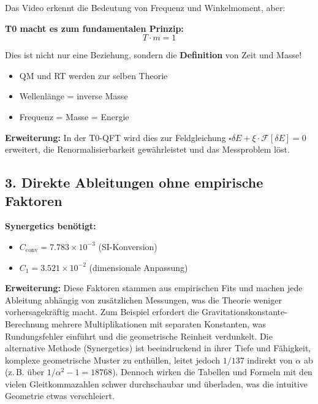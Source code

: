 \documentclass[12pt,a4paper]{article}
\newcommand{\xipar}{\xi}
\begin{document}
	Das Video erkennt die Bedeutung von Frequenz und Winkelmoment, aber:
	
	\begin{vorteil}
		\textbf{T0 macht es zum fundamentalen Prinzip:}
		\begin{equation}
			\boxed{T \cdot m = 1}
		\end{equation}
		
		Dies ist nicht nur eine Beziehung, sondern die \textbf{Definition} von Zeit und Masse!
		\begin{itemize}
			\item QM und RT werden zur selben Theorie
			\item Wellenlänge = inverse Masse
			\item Frequenz = Masse = Energie
		\end{itemize}
		
		\textbf{Erweiterung:} In der T0-QFT wird dies zur Feldgleichung $\square \delta E + \xipar \cdot \mathcal{F}[\delta E] = 0$ erweitert, die Renormalisierbarkeit gewährleistet und das Messproblem löst.
	\end{vorteil}
	
	\subsection{3. Direkte Ableitungen ohne empirische Faktoren}
	
	\textbf{Synergetics benötigt:}
	\begin{itemize}
		\item $C_{\text{conv}} = 7.783 \times 10^{-3}$ (SI-Konversion)
		\item $C_1 = 3.521 \times 10^{-2}$ (dimensionale Anpassung)
	\end{itemize}
	
	\textbf{Erweiterung:} Diese Faktoren stammen aus empirischen Fits und machen jede Ableitung abhängig von zusätzlichen Messungen, was die Theorie weniger vorhersagekräftig macht. Zum Beispiel erfordert die Gravitationskonstante-Berechnung mehrere Multiplikationen mit separaten Konstanten, was Rundungsfehler einführt und die geometrische Reinheit verdunkelt. Die alternative Methode (Synergetics) ist beeindruckend in ihrer Tiefe und Fähigkeit, komplexe geometrische Muster zu enthüllen, leitet jedoch $1/137$ indirekt von $\alpha$ ab (z.\,B. über $1/\alpha^2 - 1 = 18768$). Dennoch wirken die Tabellen und Formeln mit den vielen Gleitkommazahlen schwer durchschaubar und überladen, was die intuitive Geometrie etwas verschleiert.
	
\end{document}
